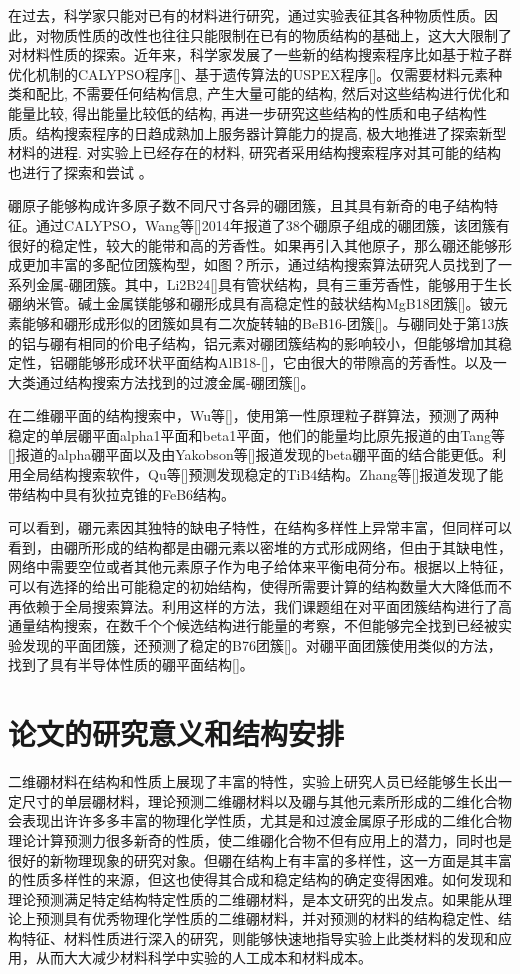 \documentclass[phd,nobackinfo]{scutthesis}
\begin{document}
在过去，科学家只能对已有的材料进行研究，通过实验表征其各种物质性质。因此，对物质性质的改性也往往只能限制在已有的物质结构的基础上，这大大限制了对材料性质的探索。近年来，科学家发展了一些新的结构搜索程序比如基于粒子群优化机制的CALYPSO程序[]、基于遗传算法的USPEX程序[]。仅需要材料元素种类和配比, 不需要任何结构信息, 产生大量可能的结构, 然后对这些结构进行优化和能量比较, 得出能量比较低的结构, 再进一步研究这些结构的性质和电子结构性质。结构搜索程序的日趋成熟加上服务器计算能力的提高, 极大地推进了探索新型材料的进程. 对实验上已经存在的材料, 研究者采用结构搜索程序对其可能的结构也进行了探索和尝试 。

硼原子能够构成许多原子数不同尺寸各异的硼团簇，且其具有新奇的电子结构特征。通过CALYPSO，Wang等[]2014年报道了38个硼原子组成的硼团簇，该团簇有很好的稳定性，较大的能带和高的芳香性。如果再引入其他原子，那么硼还能够形成更加丰富的多配位团簇构型，如图？所示，通过结构搜索算法研究人员找到了一系列金属-硼团簇。其中，Li2B24[]具有管状结构，具有三重芳香性，能够用于生长硼纳米管。碱土金属镁能够和硼形成具有高稳定性的鼓状结构MgB18团簇[]。铍元素能够和硼形成形似的团簇如具有二次旋转轴的BeB16-团簇[]。与硼同处于第13族的铝与硼有相同的价电子结构，铝元素对硼团簇结构的影响较小，但能够增加其稳定性，铝硼能够形成环状平面结构AlB18-[]，它由很大的带隙高的芳香性。以及一大类通过结构搜索方法找到的过渡金属-硼团簇[]。

在二维硼平面的结构搜索中，Wu等[]，使用第一性原理粒子群算法，预测了两种稳定的单层硼平面alpha1平面和beta1平面，他们的能量均比原先报道的由Tang等[]报道的alpha硼平面以及由Yakobson等[]报道发现的beta硼平面的结合能更低。利用全局结构搜索软件，Qu等[]预测发现稳定的TiB4结构。Zhang等[]报道发现了能带结构中具有狄拉克锥的FeB6结构。

可以看到，硼元素因其独特的缺电子特性，在结构多样性上异常丰富，但同样可以看到，由硼所形成的结构都是由硼元素以密堆的方式形成网络，但由于其缺电性，网络中需要空位或者其他元素原子作为电子给体来平衡电荷分布。根据以上特征，可以有选择的给出可能稳定的初始结构，使得所需要计算的结构数量大大降低而不再依赖于全局搜索算法。利用这样的方法，我们课题组在对平面团簇结构进行了高通量结构搜索，在数千个个候选结构进行能量的考察，不但能够完全找到已经被实验发现的平面团簇，还预测了稳定的B76团簇[]。对硼平面团簇使用类似的方法，找到了具有半导体性质的硼平面结构[]。

\section{论文的研究意义和结构安排}
二维硼材料在结构和性质上展现了丰富的特性，实验上研究人员已经能够生长出一定尺寸的单层硼材料，理论预测二维硼材料以及硼与其他元素所形成的二维化合物会表现出许许多多丰富的物理化学性质，尤其是和过渡金属原子形成的二维化合物理论计算预测力很多新奇的性质，使二维硼化合物不但有应用上的潜力，同时也是很好的新物理现象的研究对象。但硼在结构上有丰富的多样性，这一方面是其丰富的性质多样性的来源，但这也使得其合成和稳定结构的确定变得困难。如何发现和理论预测满足特定结构特定性质的二维硼材料，是本文研究的出发点。如果能从理论上预测具有优秀物理化学性质的二维硼材料，并对预测的材料的结构稳定性、结构特征、材料性质进行深入的研究，则能够快速地指导实验上此类材料的发现和应用，从而大大减少材料科学中实验的人工成本和材料成本。
\end{document}
